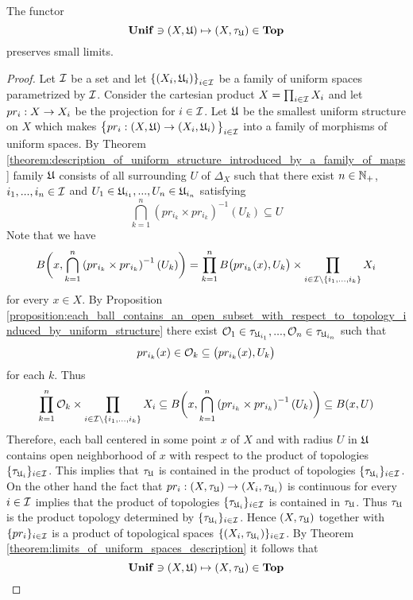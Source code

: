 \begin{theorem}\label{theorem:limits_of_uniform_spaces_description}
The functor 
$$\mathbf{Unif} \ni (X,{\mathfrak U}) \mapsto (X,\tau_{{\mathfrak U}}) \in \mathbf{Top}$$
preserves small limits.
\end{theorem}
\begin{proof}
Let ${\mathcal I}$ be a set and let $\left\{\left(X_i,{\mathfrak U}_i\right)\right\}_{i\in {\mathcal I}}$ be a family of uniform spaces parametrized by ${\mathcal I}$. Consider the cartesian product $X = \prod_{i\in {\mathcal I}}X_i$ and let $pr_i:X\rightarrow X_i$ be the projection for $i\in {\mathcal I}$. Let ${\mathfrak U}$ be the smallest uniform structure on $X$ which makes $\big\{pr_i:\left(X,{\mathfrak U}\right) \rightarrow \left(X_i,{\mathfrak U}_i\right)\big\}_{i\in {\mathcal I}}$ into a family of morphisms of uniform spaces. By Theorem \ref{theorem:description_of_uniform_structure_introduced_by_a_family_of_maps} family ${\mathfrak U}$ consists of all surrounding $U$ of $\Delta_X$ such that there exist $n\in {\mathbb N}_+$, $i_1,...,i_n\in {\mathcal I}$ and $U_1 \in {\mathfrak U}_{i_1},...,U_n\in {\mathfrak U}_{i_n}$ satisfying
$$\bigcap_{k=1}^n\left(pr_{i_k}\times pr_{i_k}\right)^{-1}(U_k) \subseteq U$$
Note that we have
$$B\bigg(x, \bigcap_{k=1}^n\left(pr_{i_k}\times pr_{i_k}\right)^{-1}(U_k)\bigg) = \prod_{k=1}^nB\big(pr_{i_k}(x), U_k\big)\times \prod_{i\in {\mathcal I}\setminus \{i_1,...,i_k\}}X_i$$
for every $x \in X$. By Proposition \ref{proposition:each_ball_contains_an_open_subset_with_respect_to_topology_induced_by_uniform_structure} there exist ${\mathcal O}_1 \in \tau_{{\mathfrak U}_{i_1}},...,{\mathcal O}_n \in \tau_{{\mathfrak U}_{i_n}}$ such that 
$$pr_{i_k}(x) \in {\mathcal O}_k \subseteq \big(pr_{i_k}(x), U_k\big)$$
for each $k$. Thus
$$\prod_{k=1}^n{\mathcal O}_k \times \prod_{i\in {\mathcal I}\setminus \{i_1,...,i_k\}}X_i \subseteq B\bigg(x, \bigcap_{k=1}^n\left(pr_{i_k}\times pr_{i_k}\right)^{-1}(U_k)\bigg) \subseteq B(x,U)$$
Therefore, each ball centered in some point $x$ of $X$ and with radius $U$ in ${\mathfrak U}$ contains open neighborhood of $x$ with respect to the product of topologies $\{\tau_{{\mathfrak U}_i}\}_{i\in  {\mathcal I}}$. This implies that $\tau_{{\mathfrak U}}$ is contained in the product of topologies $\{\tau_{{\mathfrak U}_i}\}_{i\in  {\mathcal I}}$. On the other hand the fact that $pr_i:(X,\tau_{{\mathfrak U}}) \rightarrow (X_i,\tau_{{\mathfrak U}_i})$ is continuous for every $i\in {\mathcal I}$ implies that the product of topologies $\{\tau_{{\mathfrak U}_i}\}_{i\in {\mathcal I}}$ is contained in $\tau_{{\mathfrak U}}$. Thus $\tau_{{\mathfrak U}}$ is the product topology determined by $\{\tau_{{\mathfrak U}_i}\}_{i\in {\mathcal I}}$. Hence $(X,\tau_{{\mathfrak U}})$ together with $\{pr_i\}_{i\in {\mathcal I}}$ is a product of topological spaces $\{(X_i,\tau_{{\mathfrak U}_i})\}_{i\in {\mathcal I}}$. By Theorem \ref{theorem:limits_of_uniform_spaces_description} it follows that
$$\mathbf{Unif} \ni (X,{\mathfrak U}) \mapsto (X,\tau_{{\mathfrak U}}) \in \mathbf{Top}$$

\end{proof}
